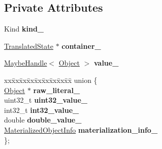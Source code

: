 \subsection*{Private Attributes}
\begin{DoxyCompactItemize}
\item 
Kind {\bfseries kind\+\_\+}\hypertarget{classv8_1_1internal_1_1_translated_value_a8be41ff0b9531e465adc8fca0b4fd91d}{}\label{classv8_1_1internal_1_1_translated_value_a8be41ff0b9531e465adc8fca0b4fd91d}

\item 
\hyperlink{classv8_1_1internal_1_1_translated_state}{Translated\+State} $\ast$ {\bfseries container\+\_\+}\hypertarget{classv8_1_1internal_1_1_translated_value_af21e9cdc2ca8f79b180e33fa70b7957e}{}\label{classv8_1_1internal_1_1_translated_value_af21e9cdc2ca8f79b180e33fa70b7957e}

\item 
\hyperlink{classv8_1_1internal_1_1_maybe_handle}{Maybe\+Handle}$<$ \hyperlink{classv8_1_1internal_1_1_object}{Object} $>$ {\bfseries value\+\_\+}\hypertarget{classv8_1_1internal_1_1_translated_value_a00a7e1fcaaa91c7b11d10fbd560a9947}{}\label{classv8_1_1internal_1_1_translated_value_a00a7e1fcaaa91c7b11d10fbd560a9947}

\item 
\begin{tabbing}
xx\=xx\=xx\=xx\=xx\=xx\=xx\=xx\=xx\=\kill
union \{\\
\>\hyperlink{classv8_1_1internal_1_1_object}{Object} $\ast$ {\bfseries raw\_literal\_}\\
\>uint32\_t {\bfseries uint32\_value\_}\\
\>int32\_t {\bfseries int32\_value\_}\\
\>double {\bfseries double\_value\_}\\
\>\hyperlink{structv8_1_1internal_1_1_translated_value_1_1_materialized_object_info}{MaterializedObjectInfo} {\bfseries materialization\_info\_}\\
\}; \hypertarget{classv8_1_1internal_1_1_translated_value_aa660cd7bb8faafd5802544caaa1f458b}{}\label{classv8_1_1internal_1_1_translated_value_aa660cd7bb8faafd5802544caaa1f458b}
\\

\end{tabbing}\end{DoxyCompactItemize}
